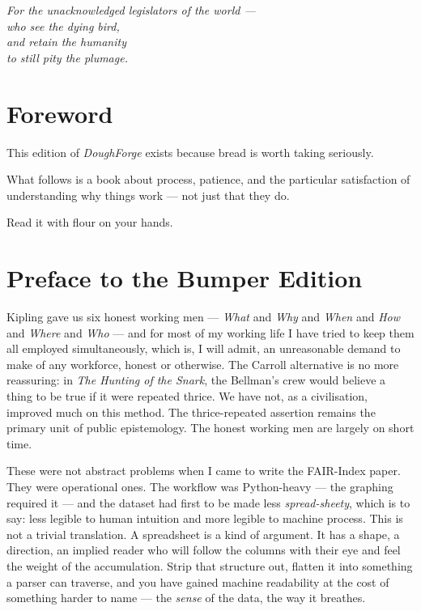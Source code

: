 \clearpage
\thispagestyle{empty}
\vspace*{3cm}
\begin{flushright}
\itshape
For the unacknowledged legislators of the world ---\\
who see the dying bird,\\
and retain the humanity\\
to still pity the plumage.
\end{flushright}
\clearpage

\section*{Foreword}

This edition of \textit{DoughForge} exists because bread is worth taking seriously.

What follows is a book about process, patience, and the particular satisfaction
of understanding why things work --- not just that they do.

Read it with flour on your hands.

\clearpage

\section*{Preface to the Bumper Edition}

Kipling gave us six honest working men --- \textit{What} and \textit{Why} and \textit{When}
and \textit{How} and \textit{Where} and \textit{Who} --- and for most of my working life I
have tried to keep them all employed simultaneously, which is, I will
admit, an unreasonable demand to make of any workforce, honest or
otherwise. The Carroll alternative is no more reassuring: in \textit{The
Hunting of the Snark}, the Bellman's crew would believe a thing to be
true if it were repeated thrice. We have not, as a civilisation,
improved much on this method. The thrice-repeated assertion remains the
primary unit of public epistemology. The honest working men are largely
on short time.

These were not abstract problems when I came to write the FAIR-Index
paper. They were operational ones. The workflow was Python-heavy --- the
graphing required it --- and the dataset had first to be made less
\textit{spread-sheety}, which is to say: less legible to human intuition and
more legible to machine process. This is not a trivial translation. A
spreadsheet is a kind of argument. It has a shape, a direction, an
implied reader who will follow the columns with their eye and feel the
weight of the accumulation. Strip that structure out, flatten it into
something a parser can traverse, and you have gained machine
readability at the cost of something harder to name --- the \textit{sense} of
the data, the way it breathes.

